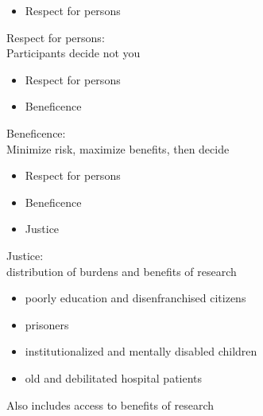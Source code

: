\documentclass{beamer}
\begin{document}
\begin{frame}

\begin{itemize}
\item Respect for persons
\end{itemize}

\end{frame}
\begin{frame}

Respect for persons:\\
Participants decide not you

\end{frame}
\begin{frame}

\begin{itemize}
\item Respect for persons
\item Beneficence
\end{itemize}

\end{frame}
\begin{frame}

Beneficence:\\
Minimize risk, maximize benefits, then decide

\end{frame}
\begin{frame}

\begin{itemize}
\item Respect for persons
\item Beneficence
\item Justice
\end{itemize}

\end{frame}
\begin{frame}

Justice:\\
distribution of burdens and benefits of research
\pause
\begin{itemize}
\item poorly education and disenfranchised citizens
\item prisoners
\item institutionalized and mentally disabled children
\item old and debilitated hospital patients
\end{itemize}
\pause
Also includes access to benefits of research

\end{frame}
\end{document}
